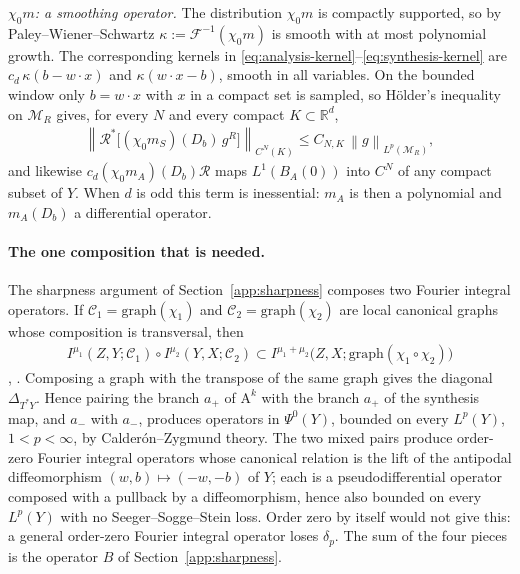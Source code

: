 \documentclass[12pt]{article}
\numberwithin{equation}{section}
\numberwithin{figure}{section}
\numberwithin{equation}{section}
\newcommand{\R}{\mathbb{R}}
\newcommand{\MR}{\mathcal M_R}
\newcommand{\norm}[1]{\left\|#1\right\|}
\begin{document}
\emph{$\chi_0m$: a smoothing operator.}  The distribution $\chi_0m$ is compactly
supported, so by Paley--Wiener--Schwartz
$\kappa:=\mathcal F^{-1}(\chi_0m)$ is smooth with at most polynomial growth.  The
corresponding kernels in \eqref{eq:analysis-kernel}--\eqref{eq:synthesis-kernel} are
$c_d\,\kappa(b-w\cdot x)$ and $\kappa(w\cdot x-b)$, smooth in all variables.  On the
bounded window only $b=w\cdot x$ with $x$ in a compact set is sampled, so H\"older's
inequality on $\MR$ gives, for every $N$ and every compact $K\subset\R^d$,
\begin{align*}
    \norm{\mathcal R^{*}\bigl[(\chi_0m_S)(D_b)\,g^{R}\bigr]}_{C^N(K)}
    \le C_{N,K}\,\norm{g}_{L^p(\MR)},
\end{align*}
and likewise $c_d(\chi_0m_A)(D_b)\mathcal R$ maps $L^1(B_A(0))$ into $C^N$ of any
compact subset of $Y$.  When $d$ is odd this term is inessential: $m_A$ is then a
polynomial and $m_A(D_b)$ a differential operator.

\paragraph{The one composition that is needed.}
The sharpness argument of Section~\ref{app:sharpness} composes two Fourier integral
operators.  If $\mathcal{C}_1=\mathrm{graph}(\chi_1)$ and $\mathcal{C}_2=\mathrm{graph}(\chi_2)$
are local canonical graphs whose composition is transversal, then
\begin{align}
    I^{\mu_1}(Z,Y;\mathcal{C}_1)\circ I^{\mu_2}(Y,X;\mathcal{C}_2)
    \subset I^{\mu_1+\mu_2}\bigl(Z,X;\mathrm{graph}(\chi_1\circ\chi_2)\bigr)
    \label{eq:fio-fio-composition}
\end{align}
\cite[Ch.~6]{sogge_FourierIntegralsClassical_2017},
\cite{hormander_LagrangianDistributionsFourier_2009}.  Composing a graph with the
transpose of the same graph gives the diagonal $\Delta_{T^*Y}$.  Hence pairing the
branch $a_+$ of $\mathrm{A}^k$ with the branch $a_+$ of the synthesis map, and $a_-$
with $a_-$, produces operators in $\Psi^0(Y)$, bounded on every $L^p(Y)$,
$1<p<\infty$, by Calder\'on--Zygmund theory.  The two mixed pairs produce order-zero
Fourier integral operators whose canonical relation is the lift of the antipodal
diffeomorphism $(w,b)\mapsto(-w,-b)$ of $Y$; each is a pseudodifferential operator
composed with a pullback by a diffeomorphism, hence also bounded on every $L^p(Y)$ with
no Seeger--Sogge--Stein loss.  Order zero by itself would not give this: a general
order-zero Fourier integral operator loses $\delta_p$.  The sum of the four pieces is
the operator $B$ of Section~\ref{app:sharpness}.
\end{document}
